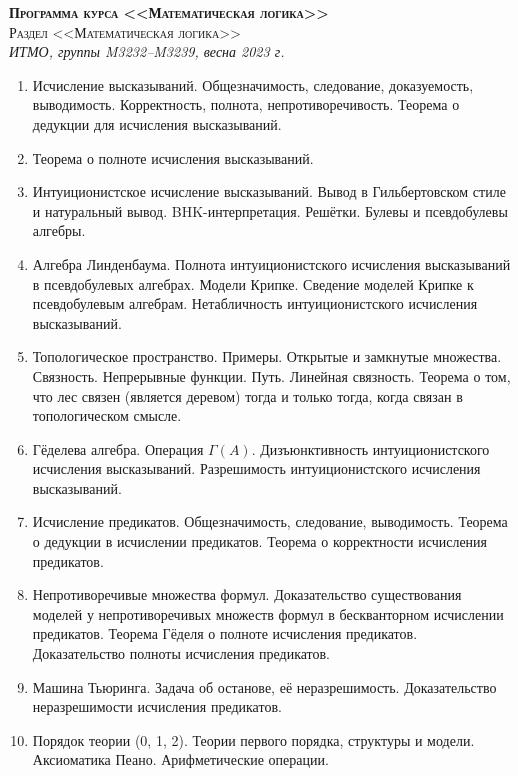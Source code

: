 \documentclass[11pt,a4paper,oneside]{scrartcl}
\begin{document}
\pagestyle{empty}

\begin{center}
{\large\scshape\bfseries Программа курса <<Математическая логика>>}\\
{\large\scshape Раздел <<Математическая логика>>}\\
\itshape ИТМО, группы M3232--M3239, весна 2023 г.
\end{center}


\begin{enumerate}
\item Исчисление высказываний. Общезначимость, следование, доказуемость, выводимость. Корректность, полнота, непротиворечивость.
Теорема о дедукции для исчисления высказываний. 
\item Теорема о полноте исчисления высказываний.
\item Интуиционистское исчисление высказываний. Вывод в Гильбертовском стиле и натуральный вывод.
BHK-интерпретация. Решётки. Булевы и псевдобулевы алгебры.
\item Алгебра Линденбаума. Полнота интуиционистского исчисления высказываний в псевдобулевых алгебрах.
Модели Крипке. Сведение моделей Крипке к псевдобулевым алгебрам. Нетабличность 
интуиционистского исчисления высказываний.
\item Топологическое пространство. Примеры. Открытые и замкнутые множества. Связность. Непрерывные функции. Путь.
Линейная связность. Теорема о том, что лес связен (является деревом) тогда и только тогда, когда связан в топологическом смысле.
\item Гёделева алгебра. Операция $\Gamma(A)$. Дизъюнктивность интуиционистского исчисления высказываний. Разрешимость 
интуиционистского исчисления высказываний.
\item Исчисление предикатов. Общезначимость, следование, выводимость. Теорема о дедукции в исчислении предикатов.
Теорема о корректности исчисления предикатов.
\item Непротиворечивые множества формул. Доказательство существования моделей у непротиворечивых множеств формул 
в бескванторном исчислении предикатов.
Теорема Гёделя о полноте исчисления предикатов. Доказательство полноты исчисления предикатов.
\item Машина Тьюринга. Задача об останове, её неразрешимость. Доказательство неразрешимости исчисления предикатов.
\item Порядок теории (0, 1, 2). Теории первого порядка, структуры и модели. Аксиоматика Пеано. Арифметические операции. 

\end{enumerate}
\end{document}
